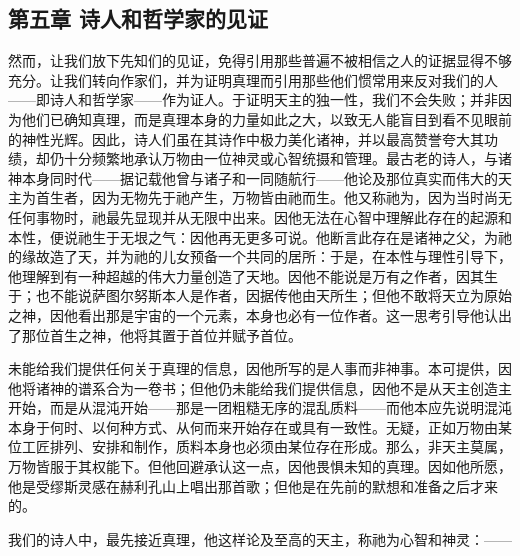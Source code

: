 
\subsection{第五章  诗人和哲学家的见证}

然而，让我们放下先知们的见证，免得引用那些普遍不被相信之人的证据显得不够充分。让我们转向作家们，并为证明真理而引用那些他们惯常用来反对我们的人——即诗人和哲学家——作为证人。于证明天主的独一性，我们不会失败；并非因为他们已确知真理，而是真理本身的力量如此之大，以致无人能盲目到看不见眼前的神性光辉。因此，诗人们虽在其诗作中极力美化诸神，并以最高赞誉夸大其功绩，却仍十分频繁地承认万物由一位神灵或心智统摄和管理。最古老的诗人，与诸神本身同时代——据记载他曾与诸子和一同随航行——他论及那位真实而伟大的天主为首生者，因为无物先于祂产生，万物皆由祂而生。他又称祂为，因为当时尚无任何事物时，祂最先显现并从无限中出来。因他无法在心智中理解此存在的起源和本性，便说祂生于无垠之气：因他再无更多可说。他断言此存在是诸神之父，为祂的缘故造了天，并为祂的儿女预备一个共同的居所：于是，在本性与理性引导下，他理解到有一种超越的伟大力量创造了天地。因他不能说是万有之作者，因其生于；也不能说萨图尔努斯本人是作者，因据传他由天所生；但他不敢将天立为原始之神，因他看出那是宇宙的一个元素，本身也必有一位作者。这一思考引导他认出了那位首生之神，他将其置于首位并赋予首位。\par

未能给我们提供任何关于真理的信息，因他所写的是人事而非神事。本可提供，因他将诸神的谱系合为一卷书；但他仍未能给我们提供信息，因他不是从天主创造主开始，而是从混沌开始——那是一团粗糙无序的混乱质料——而他本应先说明混沌本身于何时、以何种方式、从何而来开始存在或具有一致性。无疑，正如万物由某位工匠排列、安排和制作，质料本身也必须由某位存在形成。那么，非天主莫属，万物皆服于其权能下。但他回避承认这一点，因他畏惧未知的真理。因如他所愿，他是受缪斯灵感在赫利孔山上唱出那首歌；但他是在先前的默想和准备之后才来的。\par

我们的诗人中，最先接近真理，他这样论及至高的天主，称祂为心智和神灵：——\par

